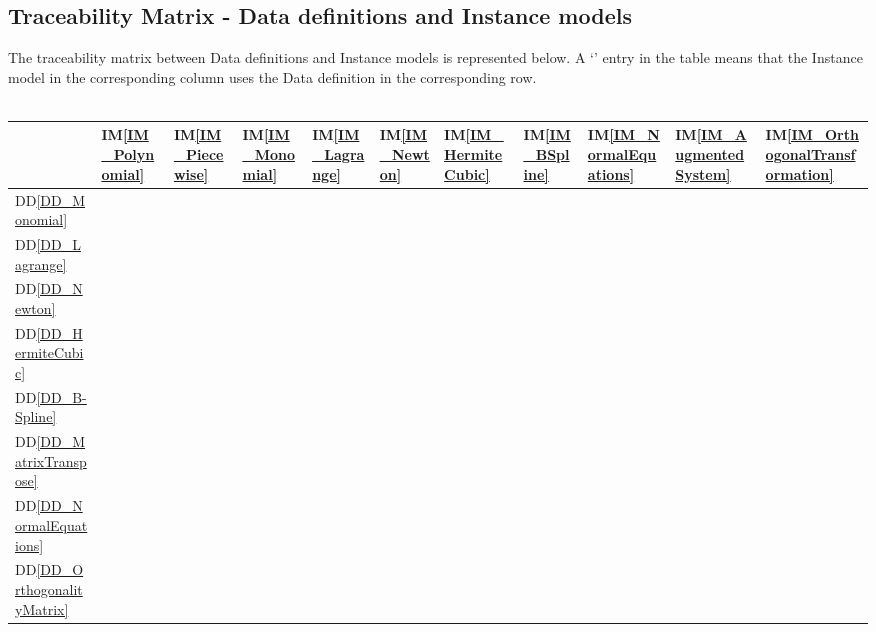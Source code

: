 \documentclass[12pt]{article}
\newcommand{\ddref}[1]{DD\ref{#1}}
\newcommand{\iref}[1]{IM\ref{#1}}
\begin{document}
\subsection{Traceability Matrix - Data definitions and Instance models}
The traceability matrix between Data definitions and Instance models is represented below. A `\checkmark' entry in the table means that the Instance model in the corresponding column uses the Data definition in the corresponding row.\\
~\newline
\begin{tabular}{|p{1.3cm}|p{1cm}|p{1cm}|p{1cm}|p{1cm}|p{1cm}|p{1cm}|p{1cm}|p{1cm}|p{1cm}|p{1cm}|}
	
	\hline
	&\iref{IM_Polynomial}  & \iref{IM_Piecewise} & \iref{IM_Monomial} & \iref{IM_Lagrange} & \iref{IM_Newton} & \iref{IM_HermiteCubic}  & \iref{IM_BSpline} & \iref{IM_NormalEquations} & \iref{IM_AugmentedSystem} & \iref{IM_OrthogonalTransformation}\\
	\hline
	\ddref{DD_Monomial} &  &   & \checkmark  &  &  &   &  &  &  & \\
	\hline
	\ddref{DD_Lagrange} &  &   &   &   \checkmark &   &    &  &  &  &  \\
	\hline
	\ddref{DD_Newton} &  & &  &  & \checkmark  &   & & & & \\
	\hline
	\ddref{DD_HermiteCubic} &  & &  &  &  & \checkmark   & & & & \\
	\hline
	\ddref{DD_B-Spline} &  & &  &  &  &   &\checkmark  & & & \\
	\hline
	\ddref{DD_MatrixTranspose} &  &   &   &   &   &    &  & \checkmark & \checkmark &  \\
	\hline
	\ddref{DD_NormalEquations} &  &  &   &   &   &  & & & \checkmark & \\
	\hline
	\ddref{DD_OrthogonalityMatrix} &  &   &   &   &   &  &  &  &  & \checkmark  \\
	\hline
\end{tabular}\\
\end{document}
